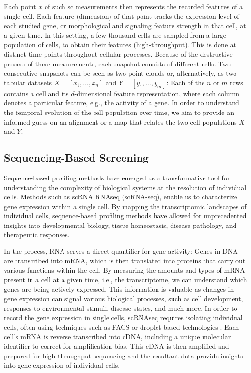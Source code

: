 Each point $x$ of such \acrlong{sc} measurements then represents the recorded features of a single cell. Each feature (dimension) of that point tracks the expression level of each studied gene, or morphological and signaling feature strength in that cell, at a given time. In this setting, a few thousand cells are sampled from a large population of cells, to obtain their features (high-throughput). This is done at distinct time points throughout cellular processes. Because of the destructive process of these measurements, each snapshot consists of different cells.
Two consecutive snapshots can be seen as two point clouds %
or, alternatively, as two tabular datasets $X = [x_1,\dots, x_n]$ and $Y=[y_1, \dots, y_m]$: Each of the $n$ or $m$ rows contains a cell and its $d$-dimensional feature representation, where each column denotes a particular feature, e.g., the activity of a gene.
In order to understand the temporal evolution of the cell population over time, we aim to provide an informed guess on an alignment or a map that relates the two cell populations $X$ and $Y$.

\subsection{Sequencing-Based Screening}
\label{sec:background_sequencing}

Sequence-based profiling methods have emerged as a transformative tool for understanding the complexity of biological systems at the resolution of individual cells. Methods such as \acrfull{sc}\acrshort{RNA} \acrfull{RNAseq} (scRNA-seq), enable us to characterize gene expression within a single cell.
By mapping the transcriptomic landscapes of individual cells, sequence-based profiling methods have allowed for unprecedented insights into developmental biology, tissue homeostasis, disease pathology, and therapeutic responses.

In the process, RNA serves a direct quantifier for gene activity: Genes in \acrfull{DNA} are transcribed into \acrfull{mRNA}, which is then translated into proteins that carry out various functions within the cell.
By measuring the amounts and types of \acrshort{mRNA} present in a cell at a given time, i.e., the transcriptome, we can understand which genes are being actively expressed. This information is valuable as changes in gene expression can signal various biological processes, such as cell development, responses to environmental stimuli, disease states, and much more. 
In order to record the gene expression in single cells, \acrshort{sc}\acrshort{RNAseq} requires isolating individual cells, often using techniques such as \acrfull{FACS} \citep{julius1972demonstration} or droplet-based technologies \citep{brouzes2009droplet, mazutis2013single, debs2012functional}. Each cell's \acrshort{mRNA} is reverse transcribed into \acrfull{cDNA}, including a unique molecular identifier to correct for amplification bias.
This \acrshort{cDNA} is then amplified and prepared for high-throughput sequencing and the resultant data provide insights into gene expression of individual cells.

